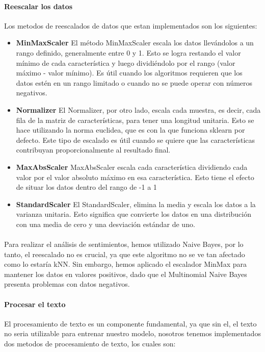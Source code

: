 \documentclass{report}
\begin{document}
                \paragraph*{Reescalar los datos} {Los metodos de reescalados de datos que estan implementados son los siguientes:}
                \begin{itemize}
                    \item \textbf{MinMaxScaler}   
                        El método MinMaxScaler escala los datos llevándolos a un rango definido, generalmente entre 0 y 1. Esto se logra restando el valor mínimo de cada característica y luego dividiéndolo por el rango (valor máximo - valor mínimo). Es útil cuando los algoritmos requieren que los datos estén en un rango limitado o cuando no se puede operar con números negativos.
                    \item \textbf{Normalizer}   
                        El Normalizer, por otro lado, escala cada muestra, es decir, cada fila de la matriz de características, para tener una longitud unitaria. Esto se hace utilizando la norma euclidea, que es con la que funciona sklearn por defecto. Este tipo de escalado es útil cuando se quiere que las características contribuyan proporcionalmente al resultado final.
                    \item \textbf{MaxAbsScaler}   
                        MaxAbsScaler escala cada característica dividiendo cada valor por el valor absoluto máximo en esa característica. Esto tiene el efecto de situar los datos dentro del rango de -1 a 1
                    \item \textbf{StandardScaler}   
                        El StandardScaler, elimina la media y escala los datos a la varianza unitaria. Esto significa que convierte los datos en una distribución con una media de cero y una desviación estándar de uno.
                \end{itemize}
                \paragraph*{}{
                    Para realizar el análisis de sentimientos, hemos utilizado Naive Bayes, por lo tanto, el reescalado no es crucial, ya que este algoritmo no se ve tan afectado como lo estaría kNN. Sin embargo, hemos aplicado el escalador MinMax para mantener los datos en valores positivos, dado que el Multinomial Naive Bayes presenta problemas con datos negativos.
                }
                \paragraph*{Procesar el texto}{
                    El procesamiento de texto es un componente fundamental, ya que sin el, el texto no seria utilizable para entrenar nuestro modelo, nosotros tenemos implementados dos metodos de procesamiento de texto, los cuales son:
                }
\end{document}
